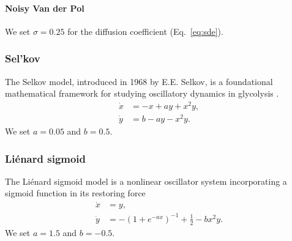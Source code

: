 \documentclass{article}
\theoremstyle{definition} \newtheorem{definition}{Definition}  \newtheorem{example}{Example}
\theoremstyle{remark} \newtheorem{remark}{Remark}
\newcounter{ct}
\begin{document}
\paragraph{Noisy Van der Pol}  
We set $\sigma = 0.25$ for the diffusion coefficient (Eq.~\ref{eq:sde}).






\subsubsection{Sel'kov}
The Selkov model, introduced in 1968 by E.E. Selkov, is a foundational mathematical framework for studying oscillatory dynamics in glycolysis \citep{selkov1968self}.
\begin{equation}
\begin{aligned}
\dot{x} &= - x + ay + x^2y, \\
\dot{y} &= b - ay - x^2y.
\end{aligned}
\end{equation}
We set $a= 0.05$ and $b=0.5$. 



\subsubsection{Li\'enard sigmoid}
The Li\'enard sigmoid model is a nonlinear oscillator system incorporating a sigmoid function in its restoring force
\begin{equation}
\begin{aligned}
\dot{x} &= y, \\
\dot{y} &= - (1+e^{-ax})^{-1} + \tfrac{1}{2} - bx^2y.
\end{aligned}
\end{equation}
We set $a= 1.5$ and $b=-0.5$. 
\end{document}
